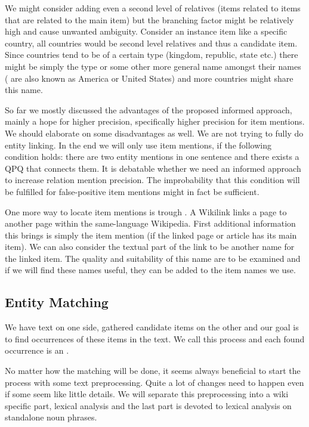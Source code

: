We might consider adding even a second level of relatives (items related to items that are related to the main item) but the branching factor might be relatively high and cause unwanted ambiguity. Consider an instance item like a specific country, all countries would be second level relatives and thus a candidate item. Since countries tend to be of a certain type (kingdom, republic, state etc.) there might be simply the type or some other more general name amongst their names ( are also known as America or United States) and more countries might share this name.

So far we mostly discussed the advantages of the proposed informed approach, mainly a hope for higher precision, specifically higher precision for item mentions. We should elaborate on some disadvantages as well. We are not trying to fully do entity linking. In the end we will only use item mentions, if the following condition holds: there are two entity mentions in one sentence and there exists a QPQ that connects them. It is debatable whether we need an informed approach to increase relation mention precision. The improbability that this condition will be fulfilled for false-positive item mentions might in fact be sufficient.

One more way to locate item mentions is trough . A Wikilink links a page to another page within the same-language Wikipedia. First additional information this brings is simply the item mention (if the linked page or article has its main item). We can also consider the textual part of the link to be another name for the linked item. The quality and suitability of this name are to be examined and if we will find these names useful, they can be added to the item names we use.


\subsection{Entity Matching}

We have text on one side, gathered candidate items on the other and our goal is to find occurrences of these items in the text. We call this process  and each found occurrence is an .

No matter how the matching will be done, it seems always beneficial to start the process with some text preprocessing. Quite a lot of changes need to happen even if some seem like little details. We will separate this preprocessing into a wiki specific part, lexical analysis and the last part is devoted to lexical analysis on standalone noun phrases.

